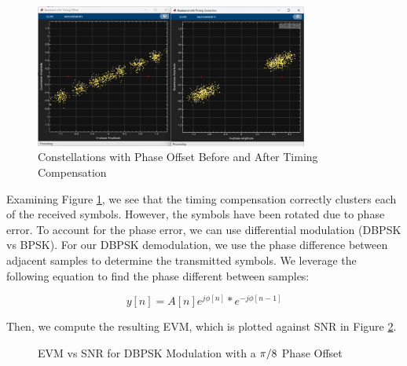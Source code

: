 \documentclass{article}
\begin{document}
\begin{figure}[H]
	\centerline{\includegraphics[width=0.8\textwidth]{constellations_with_timing_correction_phase_offset.png}}
	\caption{Constellations with Phase Offset Before and After Timing Compensation}
	\label{fig::constellations_with_timing_correction_phase_offset}
\end{figure}

\noindent Examining Figure \ref{fig::constellations_with_timing_correction_phase_offset}, we see that the timing compensation correctly clusters each of the received symbols. However, the symbols have been rotated due to phase error. To account for the phase error, we can use differential modulation (DBPSK vs BPSK). For our DBPSK demodulation, we use the phase difference between adjacent samples to determine the transmitted symbols. We leverage the following equation to find the phase different between samples:

\begin{equation}
	y[n] = A[n]e^{j\phi[n]}*e^{-j\phi[n-1]}
\end{equation}

\noindent Then, we compute the resulting EVM, which is plotted against SNR in Figure \ref{fig::evm_vs_snr_dbpsk}.

\begin{figure}[H]
	\centerline{}
	\caption{EVM vs SNR for DBPSK Modulation with a $\protect\pi/8$ Phase Offset}
	\label{fig::evm_vs_snr_dbpsk}
\end{figure}
\end{document}
